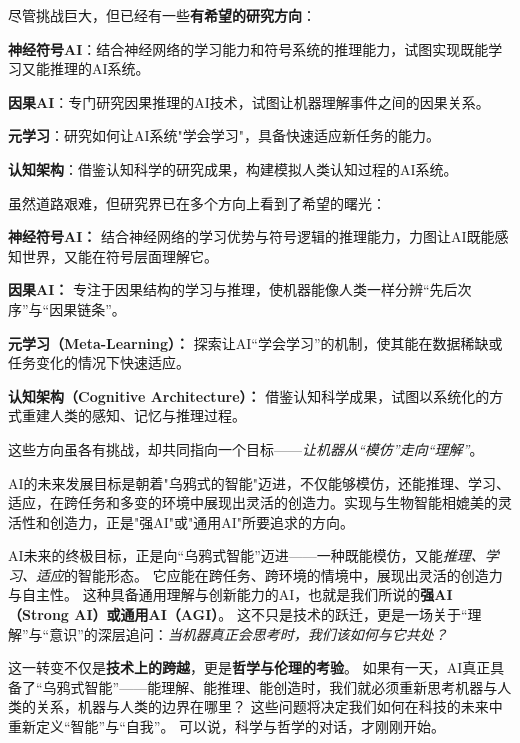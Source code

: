 尽管挑战巨大，但已经有一些\textbf{有希望的研究方向}：

\textbf{神经符号AI}：结合神经网络的学习能力和符号系统的推理能力，试图实现既能学习又能推理的AI系统。

\textbf{因果AI}：专门研究因果推理的AI技术，试图让机器理解事件之间的因果关系。

\textbf{元学习}：研究如何让AI系统"学会学习"，具备快速适应新任务的能力。

\textbf{认知架构}：借鉴认知科学的研究成果，构建模拟人类认知过程的AI系统。

虽然道路艰难，但研究界已在多个方向上看到了希望的曙光：

\textbf{神经符号AI：} 结合神经网络的学习优势与符号逻辑的推理能力，力图让AI既能感知世界，又能在符号层面理解它。

\textbf{因果AI：} 专注于因果结构的学习与推理，使机器能像人类一样分辨“先后次序”与“因果链条”。

\textbf{元学习（Meta-Learning）：} 探索让AI“学会学习”的机制，使其能在数据稀缺或任务变化的情况下快速适应。

\textbf{认知架构（Cognitive Architecture）：} 借鉴认知科学成果，试图以系统化的方式重建人类的感知、记忆与推理过程。

这些方向虽各有挑战，却共同指向一个目标——\emph{让机器从“模仿”走向“理解”}。

AI的未来发展目标是朝着"乌鸦式的智能"迈进，不仅能够模仿，还能推理、学习、适应，在跨任务和多变的环境中展现出灵活的创造力。实现与生物智能相媲美的灵活性和创造力，正是"强AI"或"通用AI"所要追求的方向。

AI未来的终极目标，正是向“乌鸦式智能”迈进——一种既能模仿，又能\emph{推理、学习、适应}的智能形态。
它应能在跨任务、跨环境的情境中，展现出灵活的创造力与自主性。
这种具备通用理解与创新能力的AI，也就是我们所说的\textbf{强AI（Strong AI）或通用AI（AGI）}。
这不只是技术的跃迁，更是一场关于“理解”与“意识”的深层追问：\emph{当机器真正会思考时，我们该如何与它共处？}

这一转变不仅是\textbf{技术上的跨越}，更是\textbf{哲学与伦理的考验}。
如果有一天，AI真正具备了“乌鸦式智能”——能理解、能推理、能创造时，我们就必须重新思考机器与人类的关系，机器与人类的边界在哪里？
这些问题将决定我们如何在科技的未来中重新定义“智能”与“自我”。
可以说，科学与哲学的对话，才刚刚开始。

